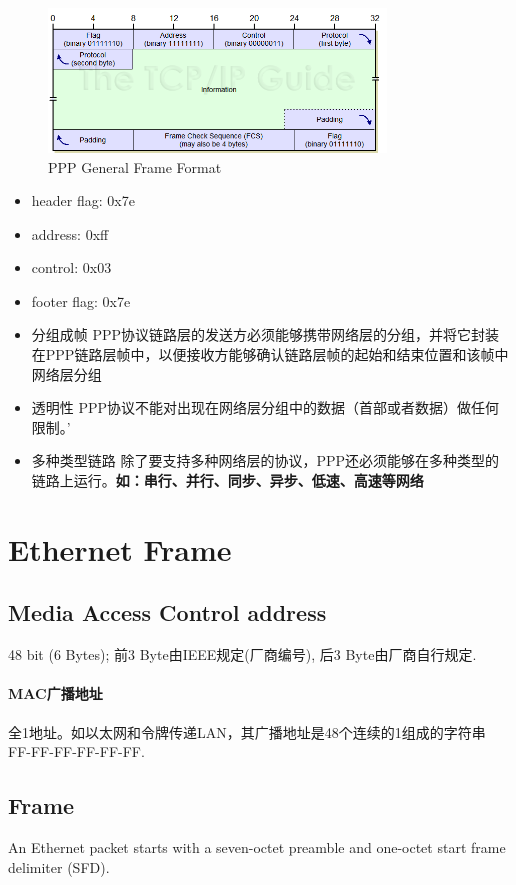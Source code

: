 \documentclass[a4paper]{report}
\begin{document}
\begin{figure}[H]
\centering
\includegraphics[width=0.8\textwidth]{pppformat.png}
\caption{PPP General Frame Format}
\end{figure}

\begin{itemize}
  \item header flag: 0x7e
  \item address: 0xff
  \item control: 0x03
  \item footer flag: 0x7e
\end{itemize}

\begin{itemize}
  \item 分组成帧
  \subitem PPP协议链路层的发送方必须能够携带网络层的分组，并将它封装在PPP链路层帧中，以便接收方能够确认链路层帧的起始和结束位置和该帧中网络层分组
  \item 透明性
  \subitem PPP协议不能对出现在网络层分组中的数据（首部或者数据）做任何限制。'
  \item 多种类型链路
  \subitem 除了要支持多种网络层的协议，PPP还必须能够在多种类型的链路上运行。\textbf{如：串行、并行、同步、异步、低速、高速等网络}
\end{itemize}

\section{Ethernet Frame}
\subsection{Media Access Control address}
48 bit (6 Bytes); 前3 Byte由IEEE规定(厂商编号), 后3 Byte由厂商自行规定. 
\paragraph{MAC广播地址}
全1地址。如以太网和令牌传递LAN，其广播地址是48个连续的1组成的字符串 FF-FF-FF-FF-FF-FF. 
\subsection{Frame}
An Ethernet packet starts with a seven-octet preamble and one-octet start frame delimiter (SFD).
\end{document}
